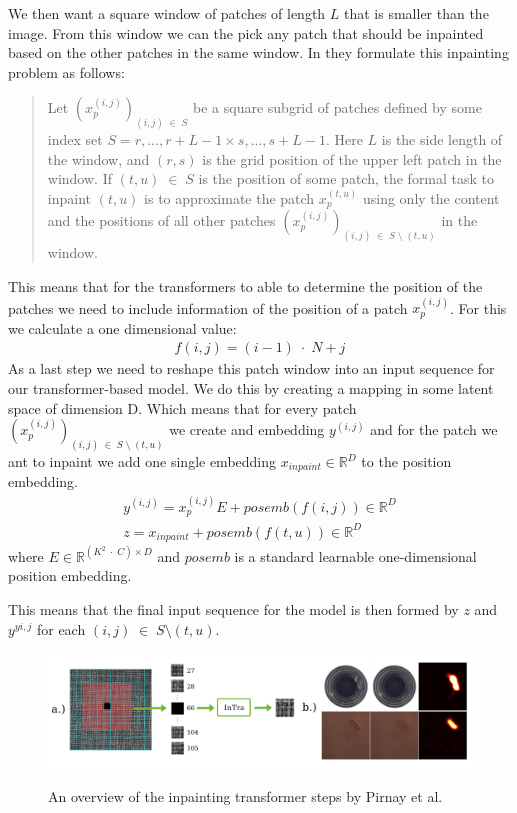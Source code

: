 We then want a square window of patches of length $L$ that is smaller than the image. From this window we can the pick any patch that should be inpainted based on the other patches in the same window. In \cite{pirnay_inpainting_2021} they formulate this inpainting problem as follows:

\begin{quote}
Let $(x_p^{(i,j)})_{(i,j) \;\in\; S}$ be a square subgrid of patches defined by some index set $S = {r,...,r+L-1} \times {s,...,s+L-1}$. Here $L$ is the side length of the window, and $(r,s)$ is the grid position of the upper left patch in the window. If $(t, u) \;\in\; S$ is the position of some patch, the formal task to inpaint $(t,u)$ is to approximate the patch $x_p^{(t,u)}$ using only the content and the positions of all other patches $(x_p^{(i,j)})_{(i,j) \;\in\; S \;\setminus\; {(t,u)}}$ in the window.
\end{quote}

This means that for the transformers to able to determine the position of the patches we need to include information of the position of a patch $x_p^{(i,j)}$. For this we calculate a one dimensional value:
%
\begin{align}
f(i,j) = (i-1) \;\cdot\; N + j 
\end{align}
%
As a last step we need to reshape this patch window into an input sequence for our transformer-based model. We do this by creating a mapping in some latent space of dimension D. Which means that for every patch $(x_p^{(i,j)})_{(i,j) \;\in\; S \;\setminus\; {(t,u)}}$ we create and embedding $y^(i,j)$ and for the patch we ant to inpaint we add one single embedding $x_{inpaint} \in \mathbb{R}^D$ to the position embedding.
%
\begin{align}
y^(i,j) = x_p^{(i,j)}E + posemb(f(i, j)) \in \mathbb{R}^D\\
z = x_{inpaint} + posemb(f(t, u)) \in \mathbb{R}^D
\end{align}
%
where $E \in \mathbb{R}^{(K^2 \;\cdot\; C) \times D}$ and $posemb$ is a standard learnable one-dimensional position embedding.

This means that the final input sequence for the model is then formed by $z$ and $y^{yi, j}$ for each $(i, j) \;\in\; S \setminus {(t,u)}$.

\begin{figure}[ht!]
\caption{An overview of the inpainting transformer steps by Pirnay et al. \cite{pirnay_inpainting_2021}}
\centering
\includegraphics[width=\textwidth]{imgs/intra-overview.png}
\label{fig:experimental-setup:intra-overview}
\end{figure}

